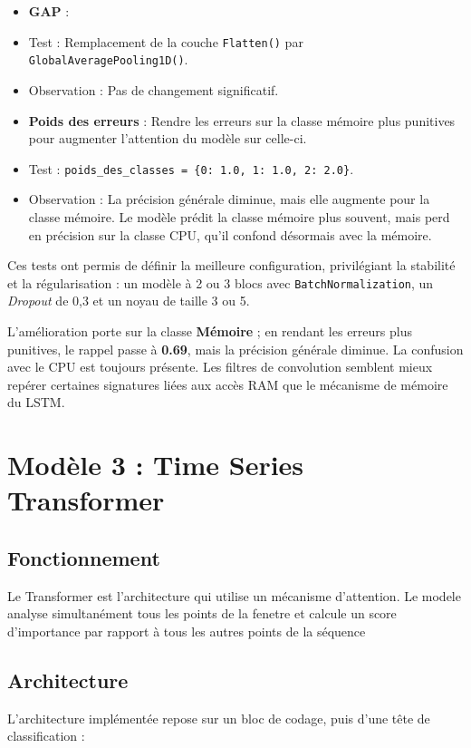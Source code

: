 \documentclass[12pt,a4paper]{report}
\begin{document}
\begin{itemize}
    \item \textbf{GAP} :
    \item Test : Remplacement de la couche \texttt{Flatten()} par \texttt{GlobalAveragePooling1D()}.
    \item Observation : Pas de changement significatif.
\end{itemize}
\begin{itemize}
    \item \textbf{Poids des erreurs} : Rendre les erreurs sur la classe mémoire plus punitives pour augmenter l'attention du modèle sur celle-ci.
    \item Test : \texttt{poids\_des\_classes = \{0: 1.0, 1: 1.0, 2: 2.0\}}.
    \item Observation : La précision générale diminue, mais elle augmente pour la classe mémoire. Le modèle prédit la classe mémoire plus souvent, mais perd en précision sur la classe CPU, qu'il confond désormais avec la mémoire.
\end{itemize}

Ces tests ont permis de définir la meilleure configuration, privilégiant la stabilité et la régularisation : un modèle à 2 ou 3 blocs avec \texttt{BatchNormalization}, un \textit{Dropout} de 0,3 et un noyau de taille 3 ou 5.

L'amélioration porte sur la classe \textbf{Mémoire} ; en rendant les erreurs plus punitives, le rappel passe à \textbf{0.69}, mais la précision générale diminue. La confusion avec le CPU est toujours présente. Les filtres de convolution semblent mieux repérer certaines signatures liées aux accès RAM que le mécanisme de mémoire du LSTM.

\chapter{Modèle 3 : Time Series Transformer}

\section{Fonctionnement}
Le Transformer est l'architecture qui utilise un mécanisme d'attention. Le modele analyse simultanément tous les points de la fenetre et calcule un score d’importance par rapport à tous les autres points de la séquence

\section{Architecture}
L'architecture implémentée repose sur un bloc de codage, puis d'une tête de classification :
\end{document}
